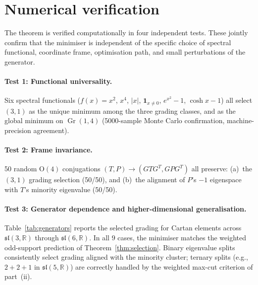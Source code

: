 \documentclass[11pt]{article}
\theoremstyle{plain}
\theoremstyle{definition}
\theoremstyle{remark}
\newcommand{\sln}[1]{\mathfrak{sl}(#1,\mathbb{R})}
\newcommand{\Gr}{\operatorname{Gr}}
\begin{document}
\section{Numerical verification}
\label{sec:numerics}

The theorem is verified computationally in four independent tests.
These jointly confirm that the minimiser is independent of the
specific choice of spectral functional, coordinate frame,
optimisation path, and small perturbations of the generator.

\paragraph{Test 1: Functional universality.}
Six spectral functionals ($f(x)=x^2$, $x^4$, $|x|$,
$\mathbf{1}_{x\ne0}$, $e^{x^2}-1$, $\cosh x-1$) all select
$(3,1)$ as the unique minimum among the three grading
classes, and as the global minimum on $\Gr(1,4)$ (5000-sample
Monte Carlo confirmation, machine-precision agreement).

\paragraph{Test 2: Frame invariance.}
50 random $\mathrm{O}(4)$ conjugations
$(T, P) \to (GTG^T, GPG^T)$ all preserve: (a)~the $(3,1)$
grading selection (50/50), and (b)~the alignment of $P$'s $-1$
eigenspace with $T$'s minority eigenvalue (50/50).

\paragraph{Test 3: Generator dependence and higher-dimensional generalisation.}
Table~\ref{tab:generators} reports the selected grading for
Cartan elements across $\sln{3}$ through $\sln{6}$.  In all $9$
cases, the minimiser matches the weighted odd-support prediction of
Theorem~\ref{thm:selection}.  Binary eigenvalue splits consistently
select grading aligned with the minority cluster; ternary splits
(e.g., $2{+}2{+}1$ in $\sln{5}$) are correctly handled by the
weighted max-cut criterion of part~(ii).
\end{document}
